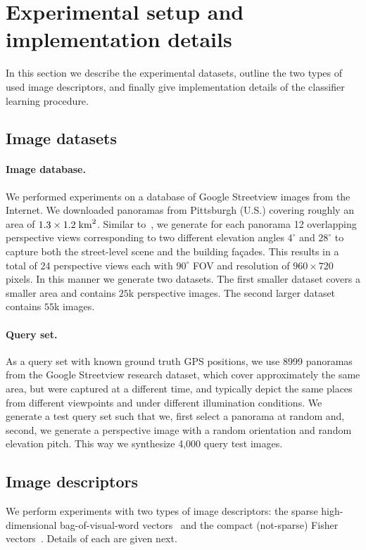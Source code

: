\section{Experimental setup and implementation details}
\label{sec:experiments}
  In this section we describe the experimental datasets, outline the two types of used image descriptors, and finally give implementation details of the classifier learning procedure.
  

  \subsection{Image datasets}
    \paragraph{Image database.}
      We performed experiments on a database of Google Streetview images from the Internet. We downloaded panoramas from Pittsburgh (U.S.) covering roughly an area of $1.3 \times 1.2 \; {\rm km}^2$. Similar to~\cite{Chen11}, we generate for each panorama 12 overlapping perspective views corresponding to two different elevation angles $4^\circ$ and $28^\circ$ to capture both the street-level scene and the building fa\c{c}ades. This results in a total of 24 perspective views each with $90^\circ$ FOV and resolution of $960 \times 720$ pixels. In this manner we generate two datasets. The first smaller dataset covers a smaller area and contains $25$k perspective images. The second larger dataset contains $55$k images.

      \paragraph{Query set.}
      As a query set with known ground truth GPS positions, we use 8999 panoramas from the Google Streetview research dataset, which cover approximately the same area, but were captured at a different time, and typically depict the same places from different viewpoints and under different illumination conditions.         
      We generate a test query set such that we, first select a panorama at random and, second, we generate a perspective image with a random orientation and random elevation pitch. This way we synthesize 4,000 query test images.

    \subsection{Image descriptors}
      We perform experiments with two types of image descriptors: the sparse high-dimensional bag-of-visual-word vectors~\cite{Sivic03} and the compact (not-sparse) Fisher vectors~\cite{Jegou12}. Details of each are given next.

